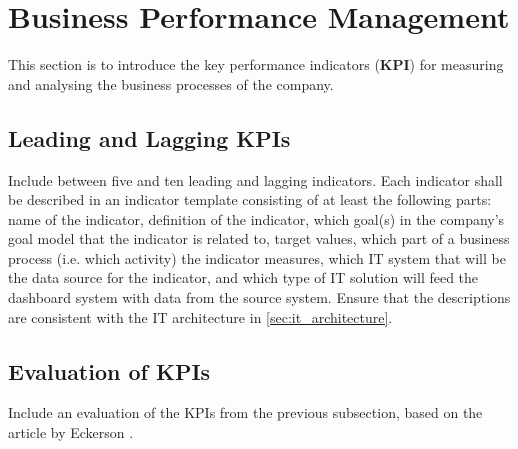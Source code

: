 
\section{Business Performance Management} \label{sec:performance}

This section is to introduce the key performance indicators (\textbf{KPI}) for measuring and analysing the business processes of
the company.

\subsection{Leading and Lagging KPIs}

Include between five and ten leading and lagging indicators.
Each indicator shall be described in an indicator template consisting of at least the following parts: name of the indicator,
definition of the indicator, which goal(s) in the company's goal model that the indicator is related to, target values, which
part of a business process (i.e. which activity) the indicator measures, which IT system that will be the data source for the
indicator, and which type of IT solution will feed the dashboard system with data from the source system.
Ensure that the descriptions are consistent with the IT architecture in \autoref{sec:it_architecture}.

\subsection{Evaluation of KPIs}

Include an evaluation of the KPIs from the previous subsection, based on the article by Eckerson
\cite[ch.~11, pp.~197--216]{Eckerson2010_Performance}.

